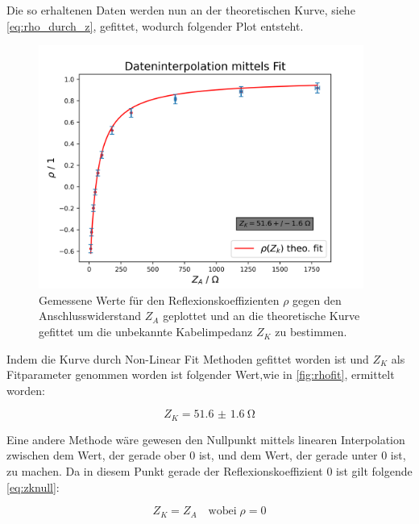 \documentclass[11pt,ngerman]{scrartcl}
\begin{document}
\noindent Die so erhaltenen Daten werden nun an der theoretischen Kurve, siehe
\autoref{eq:rho_durch_z}, gefittet, wodurch folgender Plot entsteht.

\begin{figure}[H]
	\begin{center}
		\includegraphics[width=0.95\textwidth]{./figures/fit_with_data_0.png}
	\end{center}
	\caption{Gemessene Werte für den Reflexionskoeffizienten $\rho$ gegen den
		Anschlusswiderstand $Z_A$ geplottet und an die theoretische Kurve gefittet um
		die unbekannte Kabelimpedanz $Z_K$ zu bestimmen.}
	\label{fig:rhofit}
\end{figure}


\noindent Indem die Kurve durch Non-Linear Fit Methoden gefittet worden ist und $Z_K$
als Fitparameter genommen worden ist folgender Wert,wie in
\autoref{fig:rhofit}, ermittelt worden:

\begin{equation}
	Z_K = \SI{51.6(16)}{\ohm}
\end{equation}

\noindent Eine andere Methode wäre gewesen den Nullpunkt mittels linearen Interpolation
zwischen dem Wert, der gerade ober 0 ist, und dem Wert, der gerade unter 0
ist, zu machen. Da in diesem Punkt gerade der Reflexionskoeffizient 0 ist
gilt folgende \autoref{eq:zknull}:

\begin{equation}
	Z_K = Z_A \quad \mathrm{wobei}\; \rho = 0
	\label{eq:zknull}
\end{equation}

\end{document}
